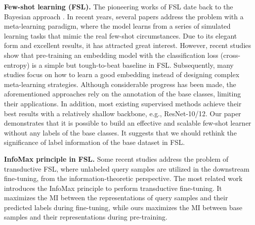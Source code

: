 \documentclass[runningheads]{llncs}
\begin{document}
\noindent\textbf{Few-shot learning (FSL).} The pioneering works of FSL date back to the Bayesian approach \cite{fei2006one,lake2015human}. In recent years, several papers \cite{vinyals2016matching,snell2017prototypical,oreshkin2018tadam,rusu2018meta,lee2019meta,flennerhag2020meta} address the problem with a meta-learning paradigm, where the model learns from a series of simulated learning tasks that mimic the real few-shot circumstances. 
Due to its elegant form and excellent results, it has attracted great interest. 
However, recent studies \cite{chen2019a,tian2020rethinking,guo2020a} show that pre-training an embedding model with the classification loss (cross-entropy) is a simple but tough-to-beat baseline in FSL.
Subsequently, many studies \cite{mangla2020charting,chen2020c,su2020when,liu2020negative,phoo2020self} focus on how to learn a good embedding instead of designing complex meta-learning strategies. 
Although considerable progress has been made, the aforementioned approaches rely on the annotation of the base classes, limiting their applications. 
In addition, most existing supervised methods \cite{vinyals2016matching,finn2017model,snell2017prototypical,oreshkin2018tadam,mishra2018a,lee2019meta,chen2019a,tian2020rethinking} achieve their best results with a relatively shallow backbone, e.g., ResNet-10/12. 
Our paper demonstrates that it is possible to build an effective and scalable few-shot learner without any labels of the base classes. 
It suggests that we should rethink the significance of label information of the base dataset in FSL.

\noindent\textbf{InfoMax principle in FSL.} Some recent studies \cite{boudiaf202transductive,dhillon2020A} address the problem of transductive FSL, where unlabeled query samples are utilized in the downstream fine-tuning, from the information-theoretic perspective.
The most related work \cite{boudiaf202transductive} introduces the InfoMax principle \cite{linsker1988self} to perform transductive fine-tuning.
It maximizes the MI between the representations of query samples and their predicted labels during fine-tuning, while ours maximizes the MI between base samples and their representations during pre-training. 
\end{document}
